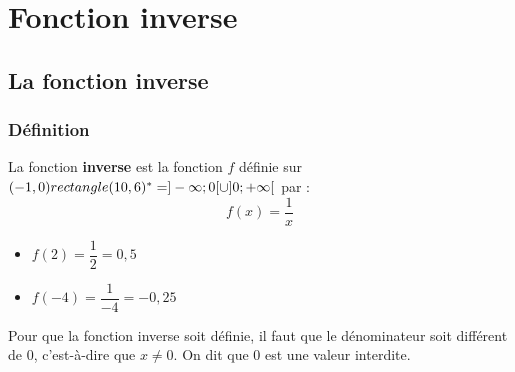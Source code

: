 

\chapter{Fonction inverse}




\section{La fonction inverse}
\subsection{Définition}

\begin{Définition}
La fonction {\bf{inverse}} est la fonction $f$ définie sur $(-1,0) rectangle (10,6)^\ast=]-\infty ; 0 [ \cup ]0 ; +\infty[$ par :
$$f(x)=\frac{1}{x}$$
\end{Définition}


 
\begin{Exemple}
\leavevmode\vspace{-\baselineskip}
\begin{itemize}[label=\textcolor{Couleur8}{$\bullet$}]
\item $f(2)=\dfrac{1}{2}=0,5$ 
\item $f(-4)=\dfrac{1}{-4}=-0,25$
\end{itemize}
\end{Exemple}


\begin{Remarque}
Pour que la fonction inverse soit définie, il faut que le dénominateur soit différent de $0$, c'est-à-dire que $x\neq 0$. On dit que $0$ est une valeur interdite.

\end{Remarque}

\vspace{0.5cm}

